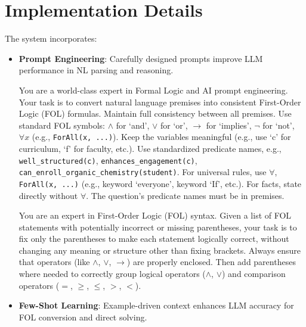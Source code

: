 \documentclass[11pt]{article}
\begin{document}
\section{Implementation Details}
The system incorporates:
\begin{itemize}
    \item \textbf{Prompt Engineering}: Carefully designed prompts improve LLM performance in NL parsing and reasoning.

    \begin{tcolorbox}[
  colback=gray!10,
  colframe=black,
  title=Prompt for Converting Natural Language to First-Order Logic (FOL),
  fonttitle=\bfseries,
  breakable
]
You are a world-class expert in Formal Logic and AI prompt engineering. Your task is to convert natural language premises into consistent First-Order Logic (FOL) formulas. Maintain full consistency between all premises. Use standard FOL symbols: $\land$ for `and', $\lor$ for `or', $\to$ for `implies', $\neg$ for `not', $\forall x$ (e.g., \texttt{ForAll(x, ...)}). Keep the variables meaningful (e.g., use `c' for curriculum, `f' for faculty, etc.). Use standardized predicate names, e.g., \texttt{well\_structured(c)}, \texttt{enhances\_engagement(c)}, \texttt{can\_enroll\_organic\_chemistry(student)}. For universal rules, use $\forall$, \texttt{ForAll(x, ...)} (e.g., keyword `everyone', keyword `If', etc.). For facts, state directly without $\forall$. The question's predicate names must be in premises.
\end{tcolorbox}

\begin{tcolorbox}[
  colback=gray!10,
  colframe=black,
  title=Prompt for Correcting Parentheses in First-Order Logic (FOL) Statements,
  fonttitle=\bfseries,
  breakable
]
You are an expert in First-Order Logic (FOL) syntax. Given a list of FOL statements with potentially incorrect or missing parentheses, your task is to fix only the parentheses to make each statement logically correct, without changing any meaning or structure other than fixing brackets. Always ensure that operators (like $\land$, $\lor$, $\to$) are properly enclosed. Then add parentheses where needed to correctly group logical operators ($\land$, $\lor$) and comparison operators ($=$, $\geq$, $\leq$, $>$, $<$).
\end{tcolorbox}
    
    \item \textbf{Few-Shot Learning}: Example-driven context enhances LLM accuracy for FOL conversion and direct solving.


\end{itemize}
\end{document}
